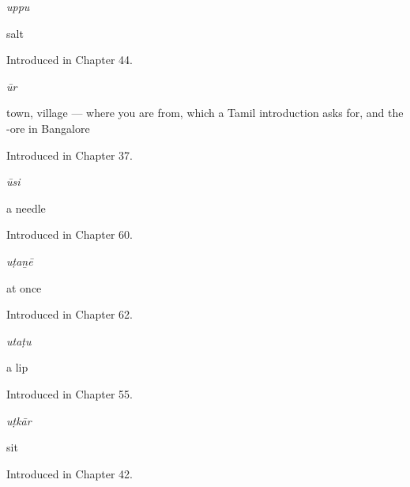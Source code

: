 \noindent\begin{minipage}[t]{\linewidth}
\raggedright
\textbf{}\enspace\emph{uppu}\par
\small salt\par
\footnotesize Introduced in Chapter 44.
\end{minipage}\par\medskip

\noindent\begin{minipage}[t]{\linewidth}
\raggedright
\textbf{}\enspace\emph{ūr}\par
\small town, village — where you are from, which a Tamil introduction asks for, and the -ore in Bangalore\par
\footnotesize Introduced in Chapter 37.
\end{minipage}\par\medskip

\noindent\begin{minipage}[t]{\linewidth}
\raggedright
\textbf{}\enspace\emph{ūsi}\par
\small a needle\par
\footnotesize Introduced in Chapter 60.
\end{minipage}\par\medskip

\noindent\begin{minipage}[t]{\linewidth}
\raggedright
\textbf{}\enspace\emph{uṭaṉē}\par
\small at once\par
\footnotesize Introduced in Chapter 62.
\end{minipage}\par\medskip

\noindent\begin{minipage}[t]{\linewidth}
\raggedright
\textbf{}\enspace\emph{utaṭu}\par
\small a lip\par
\footnotesize Introduced in Chapter 55.
\end{minipage}\par\medskip

\noindent\begin{minipage}[t]{\linewidth}
\raggedright
\textbf{}\enspace\emph{uṭkār}\par
\small sit\par
\footnotesize Introduced in Chapter 42.
\end{minipage}\par\medskip

